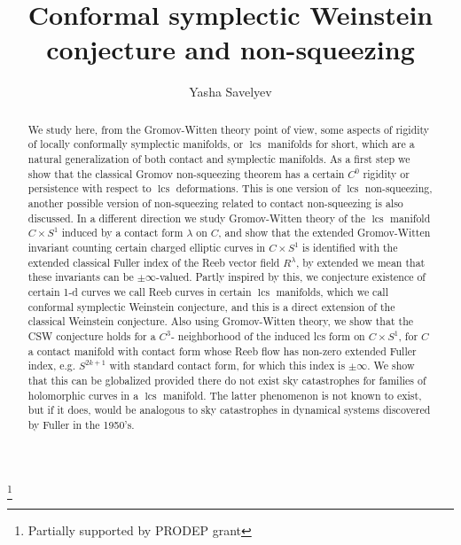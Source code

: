 \documentclass{amsart}
\numberwithin{equation}{section}
\theoremstyle{definition}
\theoremstyle{remark}
\DeclareMathOperator{\lcs}{lcs}
\begin{document}
\title{Conformal symplectic Weinstein conjecture and non-squeezing}
\author{Yasha Savelyev}
\thanks {Partially supported by PRODEP grant}
\address{University of Colima, CUICBAS}

\begin{abstract} We study here, from the Gromov-Witten theory point of view, some aspects of rigidity of locally conformally symplectic manifolds, or $\lcs$ manifolds for short, which are a natural generalization of both contact and symplectic manifolds.  As a first step we show that the classical Gromov non-squeezing theorem has a certain $C ^{0} $ rigidity or persistence with respect to $\lcs$ deformations. This is one version of $\lcs$ non-squeezing, another possible version of non-squeezing related to contact non-squeezing is also discussed.  In a different direction we study Gromov-Witten theory of the $\lcs$ manifold $C \times S ^{1} $ induced by a contact form $\lambda$ on $C$, and show that the extended Gromov-Witten invariant counting certain charged elliptic curves in $C \times S ^{1} $ is identified with the extended classical Fuller index of the Reeb vector field $R ^{\lambda} $, by extended we mean that these invariants can be $\pm \infty$-valued. Partly inspired by this, we conjecture existence of certain 1-d curves we call Reeb curves in certain $\lcs$ manifolds,  which we call conformal symplectic Weinstein conjecture, and this is a direct extension of the classical Weinstein conjecture.  Also using Gromov-Witten theory, we show that 
the CSW conjecture holds for a $C ^{3} $- neighborhood of the induced lcs form on $C \times S ^{1} $, for $C$ a contact manifold with contact form whose Reeb flow has non-zero extended Fuller index, e.g. $S ^{2k+1} $ with standard contact form, for which this index is $\pm \infty$. We show that this can be globalized provided there do not exist sky catastrophes for families of holomorphic curves in a $\lcs$ manifold. The latter phenomenon is not known to exist, but if it does, would be analogous to sky catastrophes in dynamical systems discovered by Fuller in the 1950's.  

\end{abstract}
\end{document}
